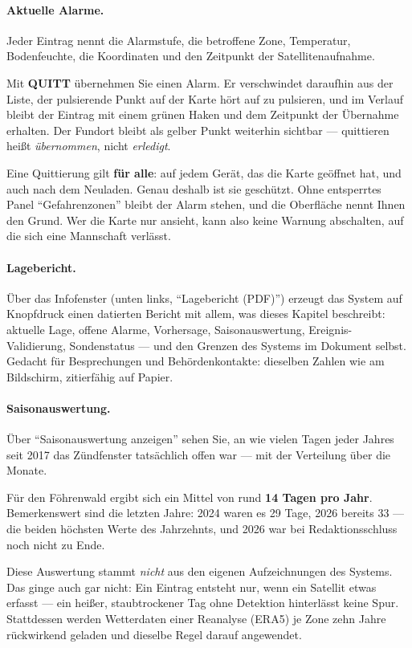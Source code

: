 \documentclass[11pt,a4paper,DIV=12,parskip=half]{scrartcl}
\begin{document}
\paragraph{Aktuelle Alarme.} Jeder Eintrag nennt die Alarmstufe, die betroffene
Zone, Temperatur, Bodenfeuchte, die Koordinaten und den Zeitpunkt der
Satellitenaufnahme.

Mit \textbf{QUITT} übernehmen Sie einen Alarm. Er verschwindet daraufhin aus
der Liste, der pulsierende Punkt auf der Karte hört auf zu pulsieren, und im
Verlauf bleibt der Eintrag mit einem grünen Haken und dem Zeitpunkt der
Übernahme erhalten. Der Fundort bleibt als gelber Punkt weiterhin sichtbar ---
quittieren heißt \emph{übernommen}, nicht \emph{erledigt}.

Eine Quittierung gilt \textbf{für alle}: auf jedem Gerät, das die Karte
geöffnet hat, und auch nach dem Neuladen. Genau deshalb ist sie geschützt.
Ohne entsperrtes Panel \enquote{Gefahrenzonen} bleibt der Alarm stehen, und
die Oberfläche nennt Ihnen den Grund. Wer die Karte nur ansieht, kann also
keine Warnung abschalten, auf die sich eine Mannschaft verlässt.

\paragraph{Lagebericht.} Über das Infofenster (unten links, \enquote{Lagebericht
(PDF)}) erzeugt das System auf Knopfdruck einen datierten Bericht mit allem,
was dieses Kapitel beschreibt: aktuelle Lage, offene Alarme, Vorhersage,
Saisonauswertung, Ereignis-Validierung, Sondenstatus --- und den Grenzen des
Systems im Dokument selbst. Gedacht für Besprechungen und Behördenkontakte:
dieselben Zahlen wie am Bildschirm, zitierfähig auf Papier.

\paragraph{Saisonauswertung.} Über \enquote{Saisonauswertung anzeigen} sehen
Sie, an wie vielen Tagen jeder Jahres seit 2017 das Zündfenster tatsächlich
offen war --- mit der Verteilung über die Monate.

Für den Föhrenwald ergibt sich ein Mittel von rund \textbf{14 Tagen pro Jahr}.
Bemerkenswert sind die letzten Jahre: 2024 waren es 29 Tage, 2026 bereits 33
--- die beiden höchsten Werte des Jahrzehnts, und 2026 war bei Redaktionsschluss
noch nicht zu Ende.

Diese Auswertung stammt \emph{nicht} aus den eigenen Aufzeichnungen des
Systems. Das ginge auch gar nicht: Ein Eintrag entsteht nur, wenn ein Satellit
etwas erfasst --- ein heißer, staubtrockener Tag ohne Detektion hinterlässt
keine Spur. Stattdessen werden Wetterdaten einer Reanalyse (ERA5) je Zone
zehn Jahre rückwirkend geladen und dieselbe Regel darauf angewendet.
\end{document}
